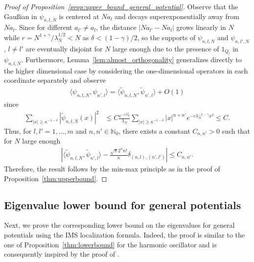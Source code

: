 \documentclass[12pt, reqno]{amsart}
\theoremstyle{definition}
\numberwithin{equation}{section}
\newcommand{\N}{{\mathbb N}}
\begin{document}
\begin{proof}[Proof of Proposition~\ref{prop:upper_bound_general_potential}]
    Observe that the Gaußian  in $\psi_{n,l,N}$ is centered at $Na_l$ and decays superexponentially away from $Na_l$.
     Since for different $a_{l'}\neq a_l$, the distance $|Na_{l'}-Na_l|$ grows linearly in $N$ while $r=N^{1+\gamma}/\lambda_N^{1/2}<N$ as $\delta<(1-\gamma)/2$, so the supports of  $\psi_{n,l,N}$ and  $\psi_{n,l',N}$, $l\neq l'$ are eventually disjoint for $N$ large enough due to the presence of $1_{Q_l}$ in $\psi_{n,l,N}$.  Furthermore, Lemma~\ref{lem:almost_orthogonality} generalizes directly to the higher dimensional case by considering the one-dimensional operators in each coordinate separately and observe
\begin{align*}
    \langle \psi_{n,l,N},\psi_{n',l }\rangle=
    \langle \tilde\psi_{n,l,N},\tilde\psi_{n',l }\rangle+O(1)
\end{align*}
since
\begin{align*}
    \sum_{|x|\ge \kappa^{-1-\delta}} |\tilde \psi_{n,l,N}(x)|^2 &\leq C\frac{e^{-c\lambda_N^\delta}}{\lambda_N}\sum_{|x|\ge \kappa^{-1-\delta}}  \left|x\right|^{n+n'}e^{-c\lambda_N^{-1-\gamma}x^2}\le C. 
\end{align*}
Thus, for $l,l'=1,\ldots,m$ and $n,n'\in \N_0$, there exists a constant $C_{n,n'}>0$ such that for $N$ large enough
    \begin{align*}
    \left|\langle \tilde\psi_{n,l,N},\tilde\psi_{n',l }\rangle- \frac{ \sqrt{\pi}2^nn!}{\kappa }\delta_{(n,l),(n',l')} \right| \leq C_{n,n'} .
\end{align*}
Therefore, the result follows by the min-max principle as in the proof of Proposition~\ref{thm:upperbound}.
\end{proof}




\subsection{Eigenvalue lower bound for general potentials}
Next, we prove the corresponding lower bound on the eigenvalues for general potentials using the IMS localization formula. Indeed, the proof is similar to the one of Proposition~\ref{thm:lowerbound} for the harmonic oscillator and is consequently inspired by the proof of \cite[Theorem 3.2]{Simon_1983}.
\end{document}
